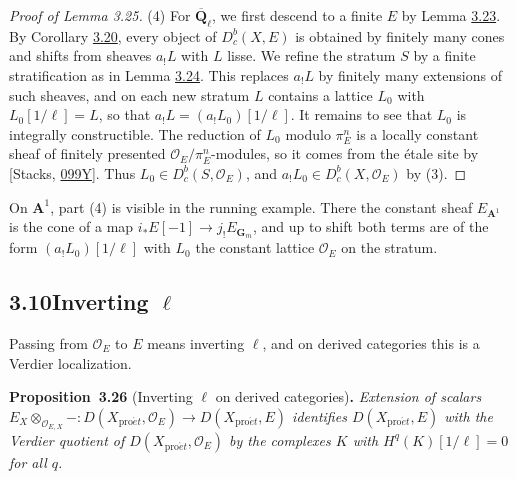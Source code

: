 \documentclass[11pt]{article}
\newenvironment{bpstatement}[2]{\par\addvspace{0.6\baselineskip}\noindent\textbf{#1}#2\textbf{.}\enspace\ignorespaces}
  {\par\addvspace{0.4\baselineskip}}
\newenvironment{bpstatementit}[2]{\begin{bpstatement}{#1}{#2}\itshape\ignorespaces}{\end{bpstatement}}
\providecommand{\Dbc}{}\renewcommand{\Dbc}{D^b_c}
\begin{document}
\begin{proof}[{Proof of Lemma 3.25}]
(4) For \(\overline{\mathbf Q}_\ell\), we first descend to a finite \(E\) by Lemma \hyperref[bp265]{3.23}. By Corollary \hyperref[bp253]{3.20}, every object of \(\Dbc(X,E)\) is obtained by finitely many cones and shifts from sheaves \(a_!L\) with \(L\) lisse. We refine the stratum \(S\) by a finite stratification as in Lemma \hyperref[bp269]{3.24}. This replaces \(a_!L\) by finitely many extensions of such sheaves, and on each new stratum \(L\) contains a lattice \(L_0\) with \(L_0[1/\ell]=L\), so that \(a_!L=(a_!L_0)[1/\ell]\). It remains to see that \(L_0\) is integrally constructible. The reduction of \(L_0\) modulo \(\pi_E^n\) is a locally constant sheaf of finitely presented \(\mathcal O_E/\pi_E^n\)-modules, so it comes from the étale site by [Stacks, \href{https://stacks.math.columbia.edu/tag/099Y}{099Y}]. Thus \(L_0\in\Dbc(S,\mathcal O_E)\), and \(a_!L_0\in\Dbc(X,\mathcal O_E)\) by (3).
\end{proof}

\label{bp277}%
On \(\mathbf A^1\), part (4) is visible in the running example. There the constant sheaf \(E_{\mathbf A^1}\) is the cone of a map \(i_*E[-1]\to j_!E_{\mathbf G_m}\), and up to shift both terms are of the form \((a_!L_0)[1/\ell]\) with \(L_0\) the constant lattice \(\mathcal O_E\) on the stratum.


\subsection*{\texorpdfstring{3.10\quad Inverting $\ell$}{3.10 Inverting ell}}
\label{bp278}%
\label{bp279}%
Passing from \(\mathcal O_E\) to \(E\) means inverting \(\ell\), and on derived categories this is a Verdier localization.

\label{bp280}%
\begin{bpstatementit}{Proposition~3.26}{ (Inverting $\ell$ on derived categories)}
Extension of scalars \(E_X\otimes_{\mathcal O_{E,X}}-:
D(X_{\mathrm{pro}\acute{e}t},\mathcal O_E)\to D(X_{\mathrm{pro}\acute{e}t},E)\) identifies \(D(X_{\mathrm{pro}\acute{e}t},E)\) with the Verdier quotient of \(D(X_{\mathrm{pro}\acute{e}t},\mathcal O_E)\) by the complexes \(K\) with \(H^q(K)[1/\ell]=0\) for all \(q\).
\end{bpstatementit}
\end{document}
